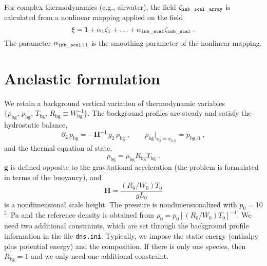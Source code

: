 For complex thermodynamics (e.g., airwater), the field $\zeta_\mathrm{\tt inb\_scal\_array}$ is calculated from a nonlinear mapping applied on the field
\begin{equation}
\xi =1+\alpha_1\zeta_1+\ldots+\alpha_\mathrm{\tt inb\_scal}\zeta_\mathrm{\tt inb\_scal}\;.
\end{equation}
The parameter $\alpha_\mathrm{\tt inb\_scal+1}$ is the smoothing parameter of the nonlinear mapping.

\section{Anelastic formulation}

We retain a background vertical variation of thermodynamic variables $\{\rho_\mathrm{bg},\, p_\mathrm{bg},\, T_\mathrm{bg},\, R_\mathrm{bg}\equiv W_\mathrm{bg}^{-1}\}$. The background profiles are steady and satisfy the hydrostatic balance,
\begin{equation}
  \partial_2\,p_\mathrm{bg}=-\mathbf{H}^{-1}\, g_2\,\rho_\mathrm{bg}\;,\qquad p_\mathrm{bg}|_{x_2=x_{2,0}}=p_{\mathrm{bg},0}\;,
\end{equation}
 and the thermal equation of state,
\begin{equation}
  p_\mathrm{bg}  = \rho_\mathrm{bg} R_\mathrm{bg} T_\mathrm{bg} \;.
\end{equation}
$\mathbf{g}$ is defined opposite to the gravitational acceleration (the problem is formulated in terms of the buoyancy), and
\begin{equation}
  \mathbf{H} = \frac{(R_0/W_0)T_0}{gL_0}
\end{equation}
is a nondimensional scale height. The pressure is nondimensionalized with $p_0=$10$^5$~Pa and the reference density is obtained from $\rho_0=p_0[(R_0/W_0)T_0]^{-1}$. We need two additional constraints, which are set through the background profile information in the file {\tt dns.ini}. Typically, we impose the static energy (enthalpy plus potential energy) and the composition.
% 
If there is only one species, then $R_\mathrm{bg}=1$ and we only need one additional constraint.


